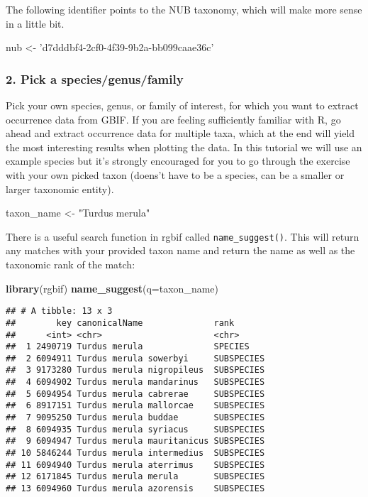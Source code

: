 \documentclass[]{article}
\newenvironment{Shaded}{\begin{snugshade}}{\end{snugshade}}
\newcommand{\DataTypeTok}[1]{\textcolor[rgb]{0.13,0.29,0.53}{#1}}
\newcommand{\KeywordTok}[1]{\textcolor[rgb]{0.13,0.29,0.53}{\textbf{#1}}}
\newcommand{\NormalTok}[1]{#1}
\newcommand{\StringTok}[1]{\textcolor[rgb]{0.31,0.60,0.02}{#1}}
\begin{document}
The following identifier points to the NUB taxonomy, which will make
more sense in a little bit.

\begin{Shaded}
\begin{Highlighting}[]
\NormalTok{nub <-}\StringTok{ 'd7dddbf4-2cf0-4f39-9b2a-bb099caae36c'}
\end{Highlighting}
\end{Shaded}

\hypertarget{pick-a-speciesgenusfamily}{%
\subsubsection{2. Pick a
species/genus/family}\label{pick-a-speciesgenusfamily}}

Pick your own species, genus, or family of interest, for which you want
to extract occurrence data from GBIF. If you are feeling sufficiently
familiar with R, go ahead and extract occurrence data for multiple taxa,
which at the end will yield the most interesting results when plotting
the data. In this tutorial we will use an example species but it's
strongly encouraged for you to go through the exercise with your own
picked taxon (doens't have to be a species, can be a smaller or larger
taxonomic entity).

\begin{Shaded}
\begin{Highlighting}[]
\NormalTok{taxon_name <-}\StringTok{ "Turdus merula"}
\end{Highlighting}
\end{Shaded}

There is a useful search function in rgbif called
\texttt{name\_suggest()}. This will return any matches with your
provided taxon name and return the name as well as the taxonomic rank of
the match:

\begin{Shaded}
\begin{Highlighting}[]
\KeywordTok{library}\NormalTok{(rgbif)}
\KeywordTok{name_suggest}\NormalTok{(}\DataTypeTok{q=}\NormalTok{taxon_name)}
\end{Highlighting}
\end{Shaded}

\begin{verbatim}
## # A tibble: 13 x 3
##        key canonicalName              rank      
##      <int> <chr>                      <chr>     
##  1 2490719 Turdus merula              SPECIES   
##  2 6094911 Turdus merula sowerbyi     SUBSPECIES
##  3 9173280 Turdus merula nigropileus  SUBSPECIES
##  4 6094902 Turdus merula mandarinus   SUBSPECIES
##  5 6094954 Turdus merula cabrerae     SUBSPECIES
##  6 8917151 Turdus merula mallorcae    SUBSPECIES
##  7 9095250 Turdus merula buddae       SUBSPECIES
##  8 6094935 Turdus merula syriacus     SUBSPECIES
##  9 6094947 Turdus merula mauritanicus SUBSPECIES
## 10 5846244 Turdus merula intermedius  SUBSPECIES
## 11 6094940 Turdus merula aterrimus    SUBSPECIES
## 12 6171845 Turdus merula merula       SUBSPECIES
## 13 6094960 Turdus merula azorensis    SUBSPECIES
\end{verbatim}
\end{document}
